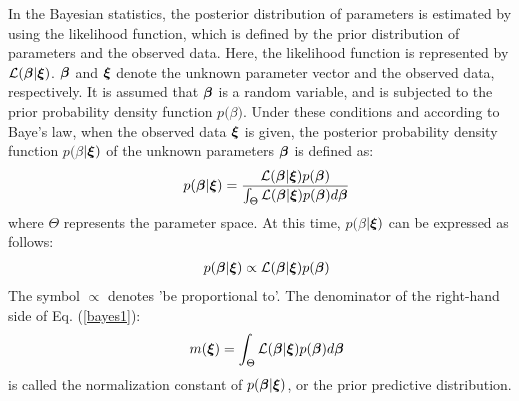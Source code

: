In the Bayesian statistics, the posterior distribution of parameters is estimated by using the likelihood function, which is defined by the prior distribution of parameters and the observed data. Here, the likelihood function is represented by ${\cal L}(\mbox{\boldmath$\beta$}|\mbox{\boldmath$\xi$})$. $\mbox{\boldmath$\beta$}$ and $\mbox{\boldmath$\xi$}$ denote the unknown parameter vector and the observed data, respectively. 
It is assumed that $\mbox{\boldmath$\beta$}$ is a random variable, and is subjected to the prior probability density function $p($\mbox{\boldmath$\beta$}$)$. Under these conditions and according to Baye's law, when the observed data $\mbox{\boldmath$\xi$}$ is given, the posterior probability density function $p($\mbox{\boldmath$\beta$}$|\mbox{\boldmath$\xi$})$ of the unknown parameters $\mbox{\boldmath$\beta$}$ is defined as:
   \begin{eqnarray}
      && p(\mbox{\boldmath$\beta$}|\mbox{\boldmath$\xi$})=
      \frac{{\cal L}(\mbox{\boldmath$\beta$}|\mbox{\boldmath$\xi$})
      p(\mbox{\boldmath$\beta$})}
      {\int_{\Theta}{\cal L}(\mbox{\boldmath$\beta$}|\mbox{\boldmath$\xi$})
      p(\mbox{\boldmath$\beta$})d\mbox{\boldmath$\beta$}}
      \label{bayes1}
   \end{eqnarray}
where $\Theta$ represents the parameter space. At this time, $p($\mbox{\boldmath$\beta$}$|\mbox{\boldmath$\xi$})$ can be expressed as follows:
   \begin{eqnarray}
      && p(\mbox{\boldmath$\beta$}|\mbox{\boldmath$\xi$})
      \propto {\cal L}(\mbox{\boldmath$\beta$}|\mbox{\boldmath$\xi$})
      p(\mbox{\boldmath$\beta$})
      \label{bayes2}
   \end{eqnarray}
The symbol $\propto$ denotes 'be proportional to'. The denominator of the right-hand side of Eq. (\ref{bayes1}):
   \begin{eqnarray}
      && m(\mbox{\boldmath$\xi$})
      =\int_{\Theta}{\cal L}(\mbox{\boldmath$\beta$}|\mbox{\boldmath$\xi$})
      p(\mbox{\boldmath$\beta$})d\mbox{\boldmath$\beta$}
      \label{bayes3}
   \end{eqnarray}
is called the normalization constant of $p(\mbox{\boldmath$\beta$}|\mbox{\boldmath$\xi$})$, or the prior predictive distribution. 

